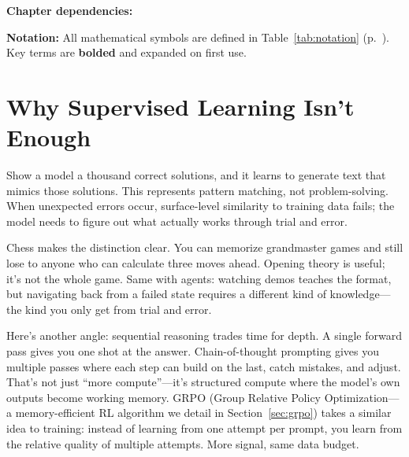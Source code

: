 \documentclass[12pt,a4paper]{report}
\theoremstyle{definition}
\begin{document}
\noindent\begin{minipage}{\linewidth}
\textbf{Chapter dependencies:}
\begin{center}
\end{center}
\end{minipage}

\textbf{Notation:} All mathematical symbols are defined in Table~\ref{tab:notation} (p.~\pageref{tab:notation}). Key terms are \textbf{bolded} and expanded on first use.

\section{Why Supervised Learning Isn't Enough}
Show a model a thousand correct solutions, and it learns to generate text that mimics those solutions. This represents pattern matching, not problem-solving. When unexpected errors occur, surface-level similarity to training data fails; the model needs to figure out what actually works through trial and error.

Chess makes the distinction clear. You can memorize grandmaster games and still lose to anyone who can calculate three moves ahead. Opening theory is useful; it's not the whole game. Same with agents: watching demos teaches the format, but navigating back from a failed state requires a different kind of knowledge---the kind you only get from trial and error.

Here's another angle: sequential reasoning trades time for depth. A single forward pass gives you one shot at the answer. Chain-of-thought prompting gives you multiple passes where each step can build on the last, catch mistakes, and adjust. That's not just ``more compute''---it's structured compute where the model's own outputs become working memory. GRPO (Group Relative Policy Optimization---a memory-efficient RL algorithm we detail in Section~\ref{sec:grpo}) takes a similar idea to training: instead of learning from one attempt per prompt, you learn from the relative quality of multiple attempts. More signal, same data budget.
\end{document}
